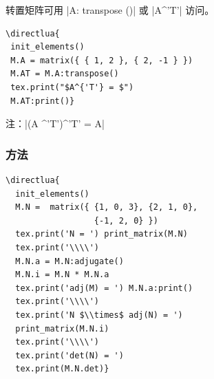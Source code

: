 转置矩阵可用 |A: transpose ()| 或 |A^{'T'}| 访问。

\vspace{.5em}
\begin{minipage}{.6\textwidth}
\begin{verbatim}
\directlua{
 init_elements()
 M.A = matrix({ { 1, 2 }, { 2, -1 } })
 M.AT = M.A:transpose()
 tex.print("$A^{'T'} = $")
 M.AT:print()}
\end{verbatim}
\end{minipage}
\begin{minipage}{.4\textwidth}
\end{minipage}

\vspace{.5em}
注：|(A ^'T')^'T' = A|

\subsubsection{方法 }
\label{ssub:method_adjugate}

\begin{minipage}{.6\textwidth}
\begin{verbatim}
\directlua{
  init_elements()
  M.N =  matrix({ {1, 0, 3}, {2, 1, 0},
                  {-1, 2, 0} })
  tex.print('N = ') print_matrix(M.N)
  tex.print('\\\\')
  M.N.a = M.N:adjugate()
  M.N.i = M.N * M.N.a
  tex.print('adj(M) = ') M.N.a:print()
  tex.print('\\\\')
  tex.print('N $\\times$ adj(N) = ')
  print_matrix(M.N.i)
  tex.print('\\\\')
  tex.print('det(N) = ')
  tex.print(M.N.det)}
\end{verbatim}
\end{minipage}
\begin{minipage}{.4\textwidth}
\end{minipage}
\newpage


